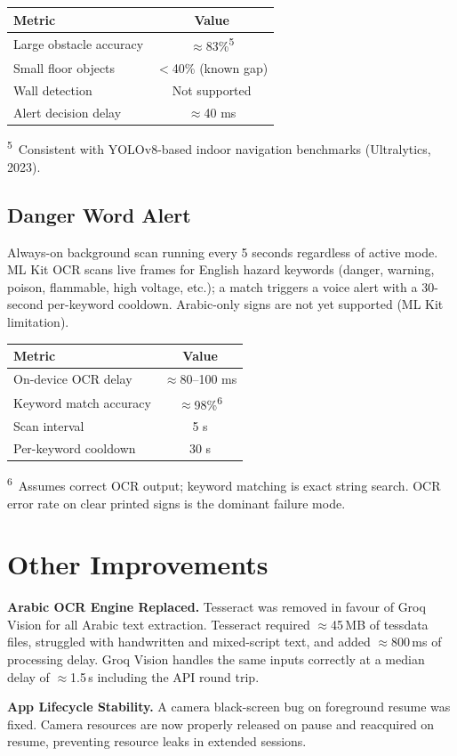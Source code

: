 \documentclass[12pt, a4paper]{article}
\begin{document}
\begin{center}
\begin{tabular}{lc}
\toprule
\textbf{Metric} & \textbf{Value} \\
\midrule
Large obstacle accuracy     & $\approx$83\%\textsuperscript{5} \\
Small floor objects         & $<$40\% (known gap) \\
Wall detection              & Not supported \\
Alert decision delay        & $\approx$40 ms \\
\bottomrule
\end{tabular}
\end{center}

{\small
\textsuperscript{5}~Consistent with YOLOv8-based indoor navigation benchmarks (Ultralytics, 2023).
}

\subsection{Danger Word Alert}

Always-on background scan running every 5 seconds regardless of active mode.
ML Kit OCR scans live frames for English hazard keywords (danger, warning, poison,
flammable, high voltage, etc.); a match triggers a voice alert with a 30-second
per-keyword cooldown. Arabic-only signs are not yet supported (ML Kit limitation).

\begin{center}
\begin{tabular}{lc}
\toprule
\textbf{Metric} & \textbf{Value} \\
\midrule
On-device OCR delay      & $\approx$80--100 ms \\
Keyword match accuracy   & $\approx$98\%\textsuperscript{6} \\
Scan interval            & 5 s \\
Per-keyword cooldown     & 30 s \\
\bottomrule
\end{tabular}
\end{center}

{\small
\textsuperscript{6}~Assumes correct OCR output; keyword matching is exact string search.
OCR error rate on clear printed signs is the dominant failure mode.
}

\section{Other Improvements}

\textbf{Arabic OCR Engine Replaced.}
Tesseract was removed in favour of Groq Vision for all Arabic text extraction.
Tesseract required $\approx$45\,MB of tessdata files, struggled with handwritten and
mixed-script text, and added $\approx$800\,ms of processing delay. Groq Vision handles
the same inputs correctly at a median delay of $\approx$1.5\,s including the API round trip.

\textbf{App Lifecycle Stability.}
A camera black-screen bug on foreground resume was fixed. Camera resources are now properly
released on pause and reacquired on resume, preventing resource leaks in extended sessions.
\end{document}
